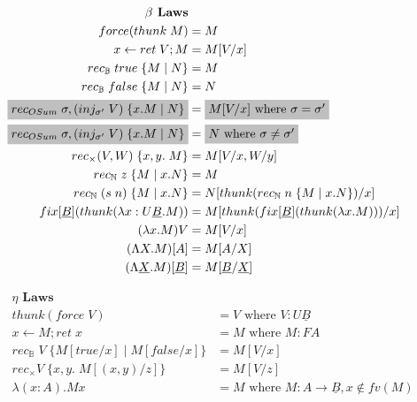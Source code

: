 \documentclass[acmsmall]{acmart}
\begin{document}
\begin{figure}[!htbp]
  \centering
  \scriptsize
  \begin{minipage}[t]{0.48\textwidth}
    \[
    \begin{aligned}
      \textbf{$\beta$ Laws}& \\
      force (thunk \; M) &= M\\
      x \leftarrow ret \; V; M &= M[V/x]\\
      rec_{\mathbb{B}} \; true \; \{M \;|\; N\} &= M \\
      rec_{\mathbb{B}} \; false \; \{M \;|\; N\} &= N \\
      \colorbox{lightgray}{$rec_{OSum}\; \sigma,(inj_{\sigma'}\;V)\;\{x.M \;|\; N\}$} &= \colorbox{lightgray}{$M[V/x] \text{ where } \sigma = \sigma'$}\\
      \colorbox{lightgray}{$rec_{OSum}\; \sigma,(inj_{\sigma'}\;V)\;\{x.M \;|\; N\}$} &= \colorbox{lightgray}{$N \text{ where } \sigma \neq \sigma'$}\\
      rec_\times (V,W)\;\{x,y.\;M\} &= M[V/x,W/y]\\
      rec_{\mathbb{N}} \; z \; \{M \;|\;x. N\} &= M \\
      rec_{\mathbb{N}} \; (s\;n) \; \{M \;|\;x. N\} &= N[thunk(rec_{\mathbb{N}} \; n \; \{M \;|\;x. N\})/x] \\
      fix[\underline{B}](thunk(\lambda x : U\underline{B}. M)) &= M[thunk(fix[\underline{B}](thunk(\lambda x. M)))/x]\\
      (\lambda x.M)V &= M[V/x]\\
      (\Lambda X.M)[A] &= M[A/X] \\
      (\Lambda \underline{X}.M)[\underline{B}] &= M[\underline{B}/\underline{X}]
    \end{aligned}
    \]
  \end{minipage}\hfill
  \begin{minipage}[t]{0.48\textwidth}
    \[
    \begin{aligned}
      \textbf{$\eta$ Laws}& \\
      thunk(force \;V) &= V  \text{ where } V : U\underline{B}\\
      x \leftarrow M; ret \; x &= M  \text{ where } M : FA \\
      rec_{\mathbb{B}} \; V \; \{M[true/x] \;|\; M[false/x]\} &= M[V/x]\\
      rec_\times V\;\{x,y.\;M[(x,y)/z]\} &= M[V/z] \\
      \lambda (x :A) . Mx &= M  \text{ where } M : A \rightarrow \underline{B}, x \notin fv(M)\\

\end{aligned}\]
\end{minipage}
\end{figure}
\end{document}
